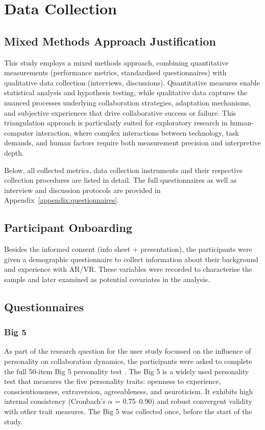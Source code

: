 \section{Data Collection}\label{sec:data-collection}

\subsection{Mixed Methods Approach Justification}\label{subsec:mixed-methods-justification}
This study employs a mixed methods approach, combining quantitative measurements (performance metrics, standardised questionnaires) with qualitative data collection (interviews, discussions). Quantitative measures enable statistical analysis and hypothesis testing, while qualitative data captures the nuanced processes underlying collaboration strategies, adaptation mechanisms, and subjective experiences that drive collaborative success or failure. This triangulation approach is particularly suited for exploratory research in human-computer interaction, where complex interactions between technology, task demands, and human factors require both measurement precision and interpretive depth.

Below, all collected metrics, data collection instruments and their respective collection procedures are listed in detail. The full questionnaires as well as interview and discussion protocols are provided in Appendix~\ref{appendix:questionnaires}.

\subsection{Participant Onboarding}\label{subsec:participant-onboarding}
Besides the informed consent (info sheet + presentation), the participants were given a demographic questionnaire to collect information about their background and experience with AR/VR. These variables were recorded to characterise the sample and later examined as potential covariates in the analysis.

\subsection{Questionnaires}\label{subsec:questionnaires}
\subsubsection{Big 5}\label{subsec:big5}
As part of the research question for the user study focussed on the influence of personality on collaboration dynamics, the participants were asked to complete the full 50-item Big 5 personality test \cite{goldberg1992development}. The Big 5 is a widely used personality test that measures the five personality traits: openness to experience, conscientiousness, extraversion, agreeableness, and neuroticism. It exhibits high internal consistency (Cronbach's $\alpha$ = 0.75--0.90) and robust convergent validity with other trait measures\cite{husain2025reliability}. The Big 5 was collected once, before the start of the study.

